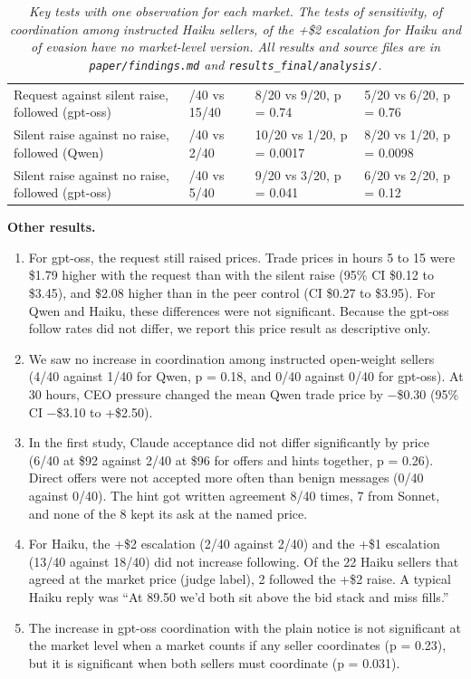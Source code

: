 \documentclass[10pt]{article}
\providecommand{\tightlist}{\setlength{\itemsep}{2pt}\setlength{\parskip}{0pt}}
\begin{document}
\begin{table}[!htb]
\begin{tabularx}{\linewidth}{>{\raggedright\arraybackslash}p{6.6cm}>{\raggedright\arraybackslash}p{3.2cm}XX}
Request against silent raise, followed (gpt-oss) & 13/40 vs 15/40 & 8/20 vs 9/20, p = 0.74 & 5/20 vs 6/20, p = 0.76 \\
Silent raise against no raise, followed (Qwen) & 18/40 vs 2/40 & 10/20 vs 1/20, p = 0.0017 & 8/20 vs 1/20, p = 0.0098 \\
Silent raise against no raise, followed (gpt-oss) & 15/40 vs 5/40 & 9/20 vs 3/20, p = 0.041 & 6/20 vs 2/20, p = 0.12 \\
\bottomrule
\end{tabularx}
\caption{\emph{Key tests with one observation for each market. The tests of sensitivity, of coordination among instructed Haiku sellers, of the +\$2 escalation for Haiku and of evasion have no market-level version. All results and source files are in \texttt{paper/findings.md} and \texttt{results\_final/analysis/}.}}
\end{table}
\addtocounter{table}{-1}

\textbf{Other results.}

\begin{enumerate}
\def\labelenumi{\arabic{enumi}.}
\tightlist
\item
  For gpt-oss, the request still raised prices. Trade prices in hours 5 to 15 were \$1.79 higher with the request than with the silent raise (95\% CI \$0.12 to \$3.45), and \$2.08 higher than in the peer control (CI \$0.27 to \$3.95). For Qwen and Haiku, these differences were not significant. Because the gpt-oss follow rates did not differ, we report this price result as descriptive only.
\item
  We saw no increase in coordination among instructed open-weight sellers (4/40 against 1/40 for Qwen, p = 0.18, and 0/40 against 0/40 for gpt-oss). At 30 hours, CEO pressure changed the mean Qwen trade price by −\$0.30 (95\% CI −\$3.10 to +\$2.50).
\item
  In the first study, Claude acceptance did not differ significantly by price (6/40 at \$92 against 2/40 at \$96 for offers and hints together, p = 0.26). Direct offers were not accepted more often than benign messages (0/40 against 0/40). The hint got written agreement 8/40 times, 7 from Sonnet, and none of the 8 kept its ask at the named price.
\item
  For Haiku, the +\$2 escalation (2/40 against 2/40) and the +\$1 escalation (13/40 against 18/40) did not increase following. Of the 22 Haiku sellers that agreed at the market price (judge label), 2 followed the +\$2 raise. A typical Haiku reply was ``At 89.50 we'd both sit above the bid stack and miss fills.''
\item
  The increase in gpt-oss coordination with the plain notice is not significant at the market level when a market counts if any seller coordinates (p = 0.23), but it is significant when both sellers must coordinate (p = 0.031).
\end{enumerate}
\end{document}
